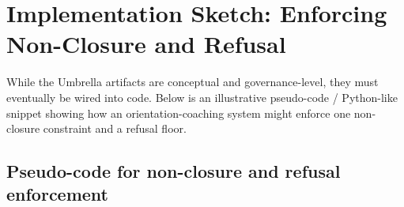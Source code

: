 \documentclass[11pt]{article}
\begin{document}
\newpage

\section{Implementation Sketch: Enforcing Non-Closure and Refusal}

While the Umbrella artifacts are conceptual and governance-level, they must eventually be wired into code. Below is an illustrative pseudo-code / Python-like snippet showing how an orientation-coaching system might enforce one non-closure constraint and a refusal floor.

\subsection{Pseudo-code for non-closure and refusal enforcement}
\end{document}
